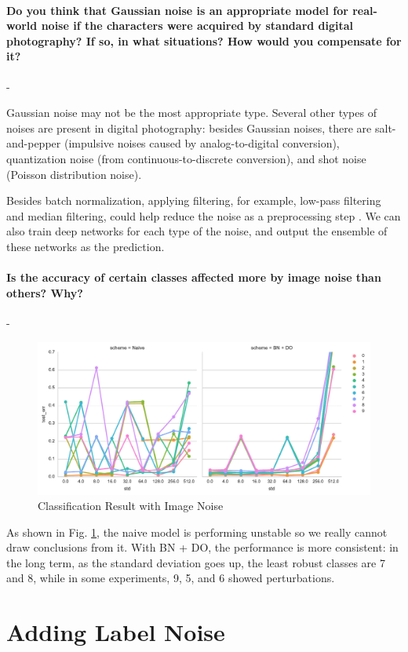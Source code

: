 \documentclass[11pt]{article}
\begin{document}
\paragraph{Do you think that Gaussian noise is an appropriate model for real-world noise if the characters were acquired by standard digital photography? If so, in what situations? How would you compensate for it?} -

Gaussian noise may not be the most appropriate type. Several other types of noises are present in digital photography: besides Gaussian noises, there are salt-and-pepper (impulsive noises caused by analog-to-digital conversion), quantization noise (from continuous-to-discrete conversion), and shot noise (Poisson distribution noise). 

Besides batch normalization, applying filtering, for example, low-pass filtering and median filtering, could help reduce the noise as a preprocessing step \cite{kaur2015noise}. We can also train deep networks for each type of the noise, and output the ensemble of these networks as the prediction.

\paragraph{Is the accuracy of certain classes affected more by image noise than others? Why?} -
\begin{figure}[H]
    \includegraphics[width=.9\textwidth]{Figs/exp2_2}
    \caption{Classification Result with Image Noise}\label{fig:exp22}
\end{figure}
As shown in Fig. \ref{fig:exp22}, the naive model is performing unstable so we really cannot draw conclusions from it. With BN + DO, the performance is more consistent: in the long term, as the standard deviation goes up, the least robust classes are 7 and 8, while in some experiments, 9, 5, and 6 showed perturbations.

\section{Adding Label Noise}
\end{document}
